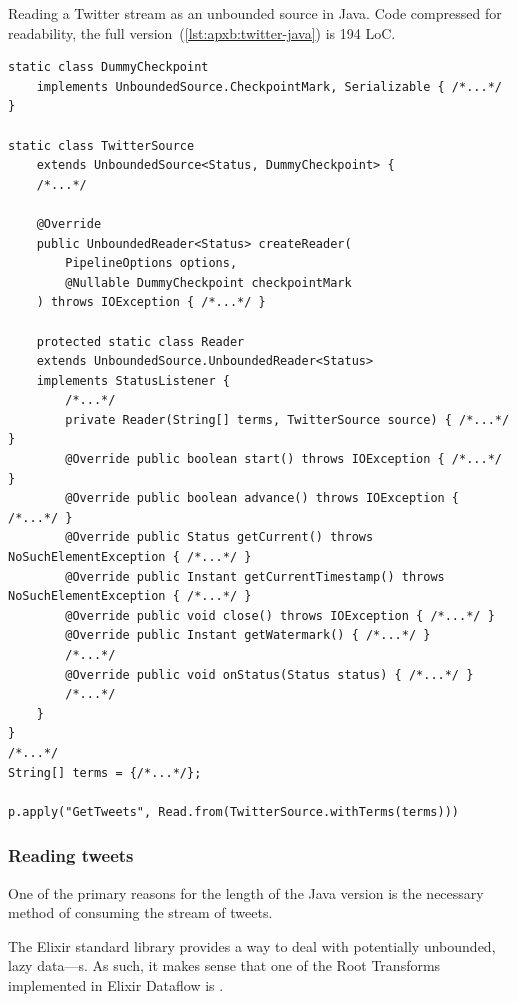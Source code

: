 \begin{codelisting}
	\caption[Reading a Twitter stream as an unbounded source in Java.]{Reading a Twitter stream as an unbounded source in Java. Code compressed for readability, the full version~(\cref{lst:apxb:twitter-java}) is 194 LoC.}
	\label{lst:eval:twitter-readstream-java}
	\begin{verbatim}
static class DummyCheckpoint
    implements UnboundedSource.CheckpointMark, Serializable { /*...*/ }
    
static class TwitterSource
    extends UnboundedSource<Status, DummyCheckpoint> {
    /*...*/
        
    @Override
    public UnboundedReader<Status> createReader(
        PipelineOptions options,
        @Nullable DummyCheckpoint checkpointMark
    ) throws IOException { /*...*/ }

    protected static class Reader
    extends UnboundedSource.UnboundedReader<Status>
    implements StatusListener {
        /*...*/
        private Reader(String[] terms, TwitterSource source) { /*...*/ }
        @Override public boolean start() throws IOException { /*...*/ }
        @Override public boolean advance() throws IOException { /*...*/ }
        @Override public Status getCurrent() throws NoSuchElementException { /*...*/ }
        @Override public Instant getCurrentTimestamp() throws NoSuchElementException { /*...*/ }
        @Override public void close() throws IOException { /*...*/ }
        @Override public Instant getWatermark() { /*...*/ }
        /*...*/
        @Override public void onStatus(Status status) { /*...*/ }
        /*...*/
    }
}
/*...*/
String[] terms = {/*...*/};

p.apply("GetTweets", Read.from(TwitterSource.withTerms(terms)))
	\end{verbatim}
\end{codelisting}

\subsubsection{Reading tweets}

One of the primary reasons for the length of the Java version is the necessary method of consuming the stream of tweets.

The Elixir standard library provides a way to deal with potentially unbounded, lazy data---s.
As such, it makes sense that one of the Root Transforms implemented in Elixir Dataflow is .

